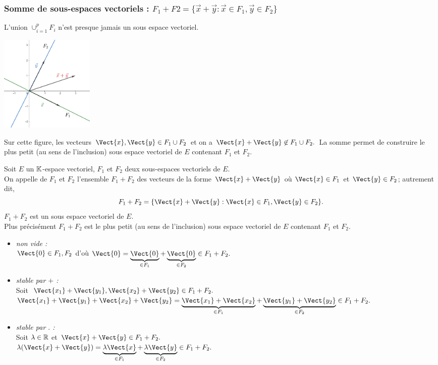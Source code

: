 \documentclass{book}
\begin{document}
\subsubsection{Somme de sous-espaces vectoriels : $F_1+F2=\{\vec{x}+\vec{y}:\vec{x} \in F_1,\vec{y} \in F_2  \}$ }
\begin{Remarque}
L'union $\cup_{i=1}^p F_i$ n'est presque jamais un sous espace vectoriel.

\begin{center}
\includegraphics[width=4.5cm]{espace_vectoriel_union.png}
\end{center}
Sur cette figure, les vecteurs $\Vect{x},\Vect{y}\in F_1\cup F_2$ et on a $\Vect{x}+\Vect{y}\not\in  F_1 \cup F_2.$ La somme permet de construire le plus petit (au sens de l'inclusion) sous espace vectoriel  de $E$ contenant $F_1$ et $F_2$.
\end{Remarque}
\begin{DefinitionProposition}[Somme]
Soit $E$ un $\mathbb{K} $-espace vectoriel, $F_1$ et $F_2$ deux sous-espaces vectoriels de $E$.\\
On appelle  de $F_1$ et $F_2$ l'ensemble $ F_1+F_2$ des vecteurs de la forme $\Vect{x} +\Vect{y}$
où $\Vect{x}\in F_1$ et $\Vect{y}\in F_2$;
autrement dit,
\[  F_1+F_2 = \{\Vect{x} +\Vect{y} : \Vect{x}\in F_1,\Vect{y}\in F_2\}. \]
$F_1+F_2$ est un sous espace vectoriel  de $E$.\\
Plus précisément $F_1+F_2$ est le plus petit (au sens de l'inclusion) sous espace vectoriel  de $E$ contenant $F_1$ et $F_2$.
\end{DefinitionProposition}
\begin{Demonstration}
\begin{itemize}
\item \textit{non vide :}\\
$\Vect{0}\in F_1,F_2$ d'où $\Vect{0}=\underbrace{\Vect{0}}_{\in F_1}+\underbrace{\Vect{0}}_{\in F_2}\in F_1+F_2.$
\item \textit{stable par $+$ :}\\
Soit $\Vect{x_1}+\Vect{y_1},\Vect{x_2}+\Vect{y_2} \in  F_1+F_2.$\\
$\Vect{x_1}+\Vect{y_1}+\Vect{x_2}+\Vect{y_2} =\underbrace{\Vect{x_1}+\Vect{x_2}}_{\in F_1}+\underbrace{\Vect{y_1}+\Vect{y_2}}_{\in F_2}\in  F_1+F_2.$
\item
  \textit{stable par $.$ :} \\
Soit $\lambda\in \mathbb{R}$ et $\Vect{x}+\Vect{y}  \in  F_1+F_2.$\\
$\lambda (\Vect{x}+\Vect{y})=\underbrace{\lambda\Vect{x}}_{\in F_1}+\underbrace{\lambda\Vect{y}}_{\in F_2} \in  F_1+F_2.$
\end{itemize}
\end{Demonstration}
\end{document}
